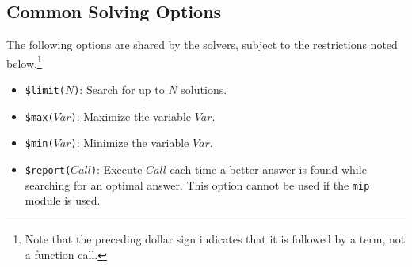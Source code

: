 \subsection{Common Solving Options}
The following options are shared by the solvers, subject to the restrictions noted below.\footnote{Note that the preceding dollar sign indicates that it is followed by a term, not a function call.}
\begin{itemize}
\item \texttt{\$limit($N$)}: Search for up to $N$ solutions.
\item \texttt{\$max($Var$)}: Maximize the variable $Var$.
\item \texttt{\$min($Var$)}: Minimize the variable $Var$.
\item \texttt{\$report($Call$)}: Execute $Call$ each time a better answer is found while searching for an optimal answer. This option cannot be used if the {\tt mip} module is used.
\end{itemize}

